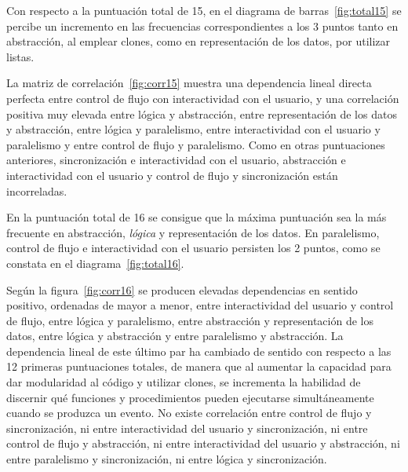 \documentclass[a4paper, 12pt]{book}
\begin{document}
Con respecto a la puntuación total de 15, en el diagrama de barras~\ref{fig:total15} se percibe un incremento en las frecuencias correspondientes a los 3 puntos tanto en abstracción, al emplear clones, como en representación de los datos, por utilizar listas.

La matriz de correlación~\ref{fig:corr15} muestra una dependencia lineal directa perfecta entre control de flujo con interactividad con el usuario, y una correlación positiva muy elevada entre lógica y abstracción, entre representación de los datos y abstracción, entre lógica y paralelismo, entre interactividad con el usuario y paralelismo y entre control de flujo y paralelismo. Como en otras puntuaciones anteriores, sincronización e interactividad con el usuario, abstracción e interactividad con el usuario y control de flujo y sincronización están incorreladas.%

En la puntuación total de 16 se consigue que la máxima puntuación sea la más frecuente en abstracción, \emph{lógica} y representación de los datos. En paralelismo, control de flujo e interactividad con el usuario persisten los 2 puntos, como se constata en el diagrama~\ref{fig:total16}.

Según la figura~\ref{fig:corr16} se producen elevadas dependencias en sentido positivo, ordenadas de mayor a menor, entre interactividad del usuario y control de flujo, entre lógica y paralelismo, entre abstracción y representación de los datos, entre lógica y abstracción y entre paralelismo y abstracción. La dependencia lineal de este último par ha cambiado de sentido con respecto a las 12 primeras puntuaciones totales, de manera que al aumentar la capacidad para dar modularidad al código y utilizar clones, se incrementa la habilidad de discernir qué funciones y procedimientos pueden ejecutarse simultáneamente cuando se produzca un evento. No existe correlación entre control de flujo y sincronización, ni entre interactividad del usuario y sincronización, ni entre control de flujo y abstracción, ni entre interactividad del usuario y abstracción, ni entre paralelismo y sincronización, ni entre lógica y sincronización. 
\end{document}
